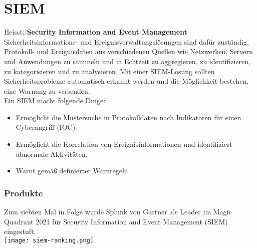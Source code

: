 \section{SIEM}
Heisst: \textbf{Security Information and Event Management}\\

Sicherheitsinformations- und Ereignisverwaltungslösungen sind dafür zuständig, Protokoll- und Ereignisdaten aus verschiedenen Quellen wie Netzwerken, Servern und Anwendungen zu sammeln und in Echtzeit zu aggregieren, zu identifizieren, zu kategorisieren und zu analysieren.
Mit einer SIEM-Lösung sollten Sicherheitsprobleme automatisch erkannt werden und die Möglichkeit bestehen, eine Warnung zu versenden.\\

Ein SIEM macht folgende Dinge:
\begin{itemize}
  \item Ermöglicht die Mustersuche in Protokolldaten nach Indikatoren für einen Cyberangriff (IOC).
  \item Ermöglicht die Korrelation von Ereignisinformationen und identifiziert abnormale Aktivitäten.
  \item Warnt gemäß definierter Warnregeln.
\end{itemize}

\subsubsection{Produkte}
Zum siebten Mal in Folge wurde Splunk von Gartner als Leader im Magic Quadrant 2021 für Security Information and Event Management (SIEM) eingestuft.\\
\texttt{[image: siem-ranking.png]}

